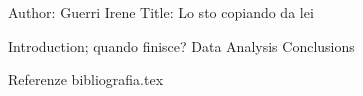 Author: Guerri Irene 
Title: Lo sto copiando da lei


Introduction; quando finisce?
Data
Analysis
Conclusions

Referenze
bibliografia.tex

